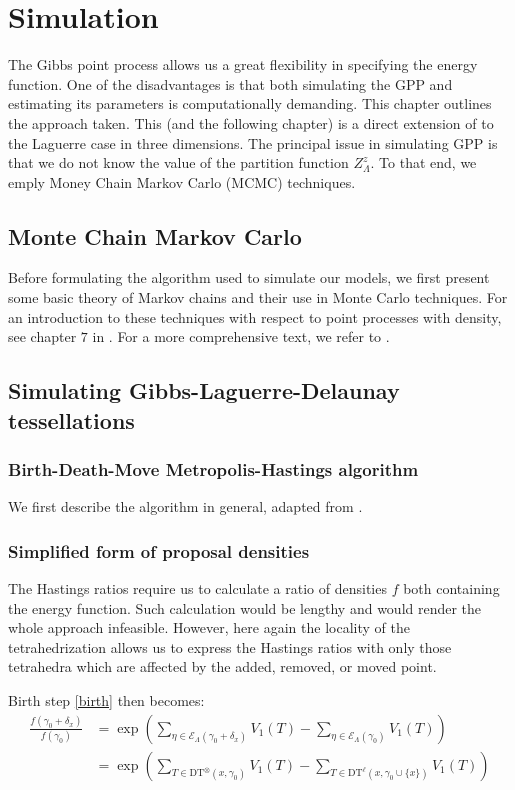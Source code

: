 \chapter{Simulation}
The Gibbs point process allows us a great flexibility in specifying the energy function. One of the disadvantages is that both simulating the GPP and estimating its parameters is computationally demanding. This chapter outlines the approach taken. This (and the following chapter) is a direct extension of \cite{DereudreLavancier2010} to the Laguerre case in three dimensions.
The principal issue in simulating GPP is that we do not know the value of the partition function $Z^z_\Lambda$. To that end, we emply Money Chain Markov Carlo (MCMC) techniques.
\section{Monte Chain Markov Carlo}
Before formulating the algorithm used to simulate our models, we first present some basic theory of Markov chains and their use in Monte Carlo techniques. For an introduction to these techniques with respect to point processes with density, see chapter $7$ in \cite{MollerWaagepetersen2003}. For a more comprehensive text, we refer to \cite{MeynTweedie1993}.

\tbd

\section{Simulating Gibbs-Laguerre-Delaunay tessellations}
\subsection{Birth-Death-Move Metropolis-Hastings algorithm}
We first describe the algorithm in general, adapted from \cite{MollerWaagepetersen2003}.


\subsection{Simplified form of proposal densities}
The Hastings ratios require us to calculate a ratio of densities $f$ both containing the energy function. Such calculation would be lengthy and would render the whole approach infeasible. However, here again the locality of the tetrahedrization allows us to express the Hastings ratios with only those tetrahedra which are affected by the added, removed, or moved point.

Birth step \ref{birth} then becomes:
\begin{align*}
\frac{f(\gamma_0 + \delta_x)}{f(\gamma_0)} &= \exp\left({\sum_{\eta\in \mathcal E_\Lambda(\gamma_0 + \delta_x)} V_1(T) - \sum_{\eta\in \mathcal E_\Lambda(\gamma_0)}V_1(T)}\right) \\
&= \exp\left(  \sum_{T \in \text{DT}^\otimes (x,\gamma_0)} V_1(T)  - \sum_{T\in \text{DT}^\ell (x,\gamma_0\cup\{x\})} V_1(T) \right)  
\end{align*}

